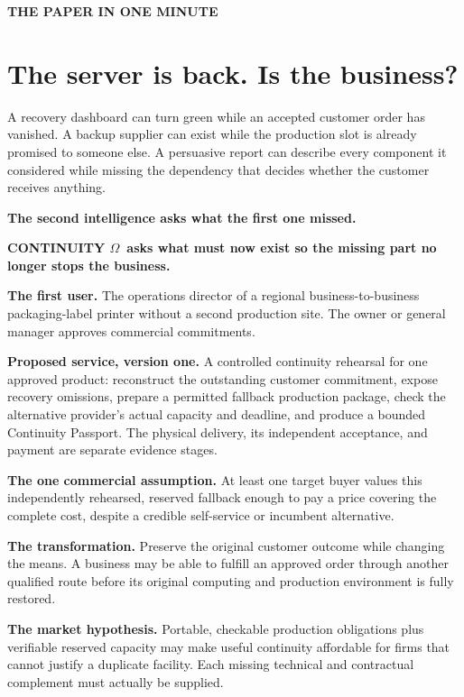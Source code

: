 \documentclass[11pt,a4paper]{article}
\newcommand{\kicker}[1]{{\sffamily\small\bfseries\color{gold}\MakeUppercase{#1}}}
\newcommand{\om}{CONTINUITY $\Omega$}
\begin{document}
\kicker{The paper in one minute}
\section*{The server is back. Is the business?}
A recovery dashboard can turn green while an accepted customer order has vanished. A backup supplier can exist while the production slot is already promised to someone else. A persuasive report can describe every component it considered while missing the dependency that decides whether the customer receives anything.

\begin{insight}
\large\textbf{The second intelligence asks what the first one missed.}\par
\textbf{\om\ asks what must now exist so the missing part no longer stops the business.}
\end{insight}

\textbf{The first user.} The operations director of a regional business-to-business packaging-label printer without a second production site. The owner or general manager approves commercial commitments.

\textbf{Proposed service, version one.} A controlled continuity rehearsal for one approved product: reconstruct the outstanding customer commitment, expose recovery omissions, prepare a permitted fallback production package, check the alternative provider's actual capacity and deadline, and produce a bounded Continuity Passport. The physical delivery, its independent acceptance, and payment are separate evidence stages.

\textbf{The one commercial assumption.} At least one target buyer values this independently rehearsed, reserved fallback enough to pay a price covering the complete cost, despite a credible self-service or incumbent alternative.

\textbf{The transformation.} Preserve the original customer outcome while changing the means. A business may be able to fulfill an approved order through another qualified route before its original computing and production environment is fully restored.

\textbf{The market hypothesis.} Portable, checkable production obligations plus verifiable reserved capacity may make useful continuity affordable for firms that cannot justify a duplicate facility. Each missing technical and contractual complement must actually be supplied.
\end{document}
